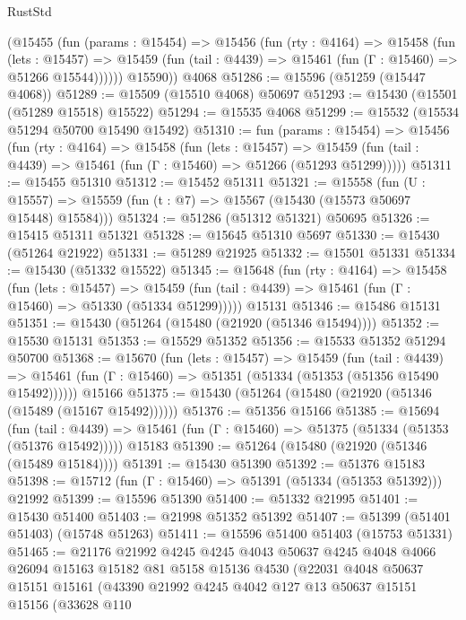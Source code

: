 \begin{lexlean}{RustStd}
\begin{coremodule}
{\begin{coremodule}
{{{{{{{{{{{{{{{{{{{{{{{{{{{{{{{{{{{{{{{{{{{{{{{{{{{{{{{{{{{{        (@15455
          (fun (params : @15454) =>
          @15456
            (fun (rty : @4164) =>
            @15458
              (fun (lets : @15457) =>
              @15459 (fun (tail : @4439) => @15461 (fun (Γ : @15460) => @51266 @15544))))))
        @15590))
    @4068
@51286 := @15596 (@51259 (@15447 @4068))
@51289 := @15509 (@15510 @4068) @50697
@51293 := @15430 (@15501 (@51289 @15518) @15522)
@51294 := @15535 @4068
@51299 := @15532 (@15534 @51294 @50700 @15490 @15492)
@51310 := fun (params : @15454) =>
  @15456
    (fun (rty : @4164) =>
    @15458
      (fun (lets : @15457) =>
      @15459 (fun (tail : @4439) => @15461 (fun (Γ : @15460) => @51266 (@51293 @51299)))))
@51311 := @15455 @51310
@51312 := @15452 @51311
@51321 := @15558
    (fun (U : @15557) => @15559 (fun (t : @7) => @15567 (@15430 (@15573 @50697 @15448) @15584)))
@51324 := @51286 (@51312 @51321) @50695
@51326 := @15415 @51311 @51321
@51328 := @15645 @51310 @5697
@51330 := @15430 (@51264 @21922)
@51331 := @51289 @21925
@51332 := @15501 @51331
@51334 := @15430 (@51332 @15522)
@51345 := @15648
    (fun (rty : @4164) =>
    @15458
      (fun (lets : @15457) =>
      @15459 (fun (tail : @4439) => @15461 (fun (Γ : @15460) => @51330 (@51334 @51299)))))
    @15131
@51346 := @15486 @15131
@51351 := @15430 (@51264 (@15480 (@21920 (@51346 @15494))))
@51352 := @15530 @15131
@51353 := @15529 @51352
@51356 := @15533 @51352 @51294 @50700
@51368 := @15670
    (fun (lets : @15457) =>
    @15459
      (fun (tail : @4439) =>
      @15461 (fun (Γ : @15460) => @51351 (@51334 (@51353 (@51356 @15490 @15492))))))
    @15166
@51375 := @15430 (@51264 (@15480 (@21920 (@51346 (@15489 (@15167 @15492))))))
@51376 := @51356 @15166
@51385 := @15694
    (fun (tail : @4439) => @15461 (fun (Γ : @15460) => @51375 (@51334 (@51353 (@51376 @15492)))))
    @15183
@51390 := @51264 (@15480 (@21920 (@51346 (@15489 @15184))))
@51391 := @15430 @51390
@51392 := @51376 @15183
@51398 := @15712 (fun (Γ : @15460) => @51391 (@51334 (@51353 @51392))) @21992
@51399 := @15596 @51390
@51400 := @51332 @21995
@51401 := @15430 @51400
@51403 := @21998 @51352 @51392
@51407 := @51399 (@51401 @51403) (@15748 @51263)
@51411 := @15596 @51400 @51403 (@15753 @51331)
@51465 := @21176
    @21992
    @4245
    @4245
    @4043
    @50637
    @4245
    @4048
    @4066
    @26094
    @15163
    @15182
    @81
    @5158
    @15136
    @4530
    (@22031
      @4048
      @50637
      @15151
      @15161
      (@43390
        @21992
        @4245
        @4042
        @127
        @13
        @50637
        @15151
        @15156
        (@33628
          @110
}}}}}}}}}}}}}}}}}}}}}}}}}}}}}}}}}}}}}}}}}}}}}}}}}}}}}}}}}}}}
\end{coremodule}}
\end{coremodule}
\end{lexlean}
